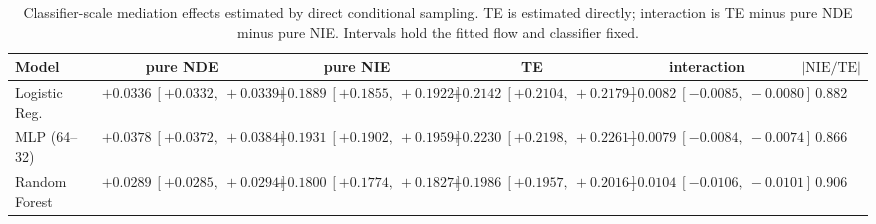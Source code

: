 \begin{table}[htbp]
  \centering
  \caption{Classifier-scale mediation effects estimated by direct conditional sampling. TE is estimated directly; interaction is TE minus pure NDE minus pure NIE. Intervals hold the fitted flow and classifier fixed.}
  \label{tab:german_synth_gap_overall}
  \begin{tabular}{lccccc}
    \toprule
    Model & pure NDE & pure NIE & TE & interaction & $|\mathrm{NIE}/\mathrm{TE}|$ \\
    \midrule
    Logistic Reg. & $+0.0336\ [+0.0332,\ +0.0339]$ & $+0.1889\ [+0.1855,\ +0.1922]$ & $+0.2142\ [+0.2104,\ +0.2179]$ & $-0.0082\ [-0.0085,\ -0.0080]$ & 0.882 \\
    MLP (64--32) & $+0.0378\ [+0.0372,\ +0.0384]$ & $+0.1931\ [+0.1902,\ +0.1959]$ & $+0.2230\ [+0.2198,\ +0.2261]$ & $-0.0079\ [-0.0084,\ -0.0074]$ & 0.866 \\
    Random Forest & $+0.0289\ [+0.0285,\ +0.0294]$ & $+0.1800\ [+0.1774,\ +0.1827]$ & $+0.1986\ [+0.1957,\ +0.2016]$ & $-0.0104\ [-0.0106,\ -0.0101]$ & 0.906 \\
    \bottomrule
  \end{tabular}
\end{table}